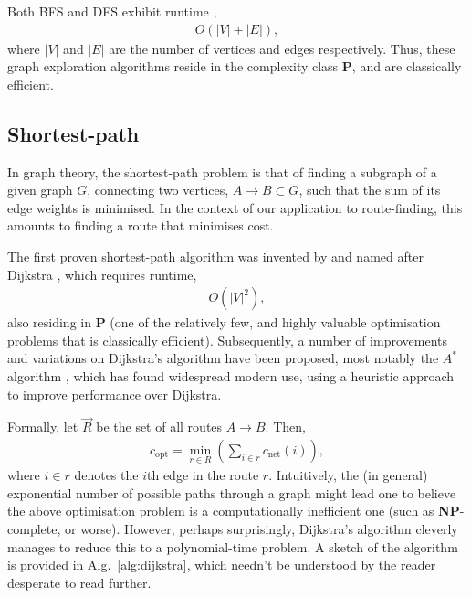 Both BFS and DFS exhibit runtime	,
\begin{align}
	O(|V|+|E|),
\end{align}
where $|V|$ and $|E|$ are the number of vertices and edges respectively. Thus, these graph exploration algorithms reside in the complexity class \textbf{P}, and are classically efficient.

%
%

\subsection{Shortest-path} \label{sec:shortest_path} 

In graph theory, the shortest-path problem is that of finding a subgraph of a given graph $G$, connecting two vertices, \mbox{$A\to B \subset G$}, such that the sum of its edge weights is minimised. In the context of our application to route-finding, this amounts to finding a route that minimises cost.

The first proven shortest-path algorithm was invented by and named after Dijkstra \cite{bib:Dijkstra59}, which requires runtime,
\begin{align}
	O(|V|^2),
\end{align}
also residing in \textbf{P} (one of the relatively few, and highly valuable optimisation problems that is classically efficient). Subsequently, a number of improvements and variations on Dijkstra's algorithm have been proposed, most notably the $A^*$ algorithm \cite{bib:Astar}, which has found widespread modern use, using a heuristic approach to improve performance over Dijkstra.

Formally, let $\vec{R}$ be the set of all routes \mbox{$A\to B$}. Then,
\begin{align}
c_\mathrm{opt} = \min_{r\in R} \left(\sum_{i\in r} c_\mathrm{net}(i) \right),
\end{align}
where \mbox{$i\in r$} denotes the $i$th edge in the route $r$. Intuitively, the (in general) exponential number of possible paths through a graph might lead one to believe the above optimisation problem is a computationally inefficient one (such as \textbf{NP}-complete, or worse). However, perhaps surprisingly, Dijkstra's algorithm cleverly manages to reduce this to a polynomial-time problem. A sketch of the algorithm is provided in Alg.~\ref{alg:dijkstra}, which needn't be understood by the reader desperate to read further.

